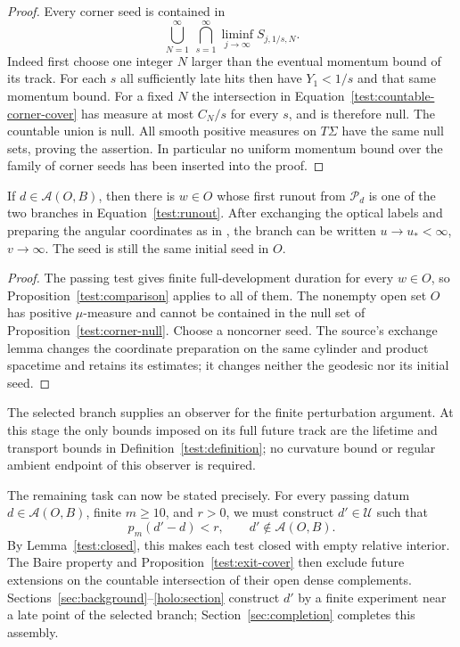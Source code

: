 \begin{proof}
Every corner seed is contained in
\begin{equation}\label{test:countable-corner-cover}
 \bigcup_{N=1}^{\infty}\ \bigcap_{s=1}^{\infty}
                   \liminf_{j\to\infty}S_{j,1/s,N}.
\end{equation}
Indeed first choose one integer $N$ larger than the eventual momentum
bound of its track. For each $s$ all sufficiently late hits then have
$Y_1<1/s$ and that same momentum bound. For a fixed $N$ the
intersection in Equation~\eqref{test:countable-corner-cover} has
measure at most $C_N/s$ for every $s$, and is therefore null.
The countable union is null. All smooth positive measures on
$T\Sigma$ have the same null sets, proving the assertion. In
particular no uniform momentum bound over the family of corner seeds
has been inserted into the proof.
\end{proof}

\begin{corollary}
\label{test:branch-seed}
If $d\in\mathcal A(O,B)$, then there is $w\in O$ whose first
runout from $\mathcal P_d$ is one of the two branches in
Equation~\eqref{test:runout}. After exchanging the optical labels
and preparing the angular coordinates as in
\cite[]{Foundation},
the branch can be written
$u\to u_*<\infty$, $v\to\infty$. The seed is still the
same initial seed in $O$.
\end{corollary}

\begin{proof}
The passing test gives finite full-development duration for every
$w\in O$, so Proposition~\ref{test:comparison} applies to all of
them. The nonempty open set $O$ has positive $\mu$-measure and
cannot be contained in the null set of
Proposition~\ref{test:corner-null}. Choose a noncorner seed. The
source's exchange lemma changes the coordinate preparation on the
same cylinder and product spacetime and retains its estimates; it
changes neither the geodesic nor its initial seed.
\end{proof}

The selected branch supplies an observer for the finite perturbation
argument. At this stage the only bounds imposed on its full future
track are the lifetime and transport bounds in
Definition~\ref{test:definition}; no curvature bound or regular
ambient endpoint of this observer is required.

The remaining task can now be stated precisely. For every passing datum
$d\in\mathcal A(O,B)$, finite $m\ge10$, and $r>0$, we must construct
$d'\in\mathcal U$ such that
\begin{equation}\label{test:density-target}
 p_m(d'-d)<r,\qquad d'\notin\mathcal A(O,B).
\end{equation}
By Lemma~\ref{test:closed}, this makes each test closed with empty
relative interior. The Baire property and Proposition~\ref{test:exit-cover}
then exclude future extensions on the countable intersection of their
open dense complements. Sections~\ref{sec:background}--\ref{holo:section}
construct $d'$ by a finite experiment near a late point of the selected
branch; Section~\ref{sec:completion} completes this assembly.
